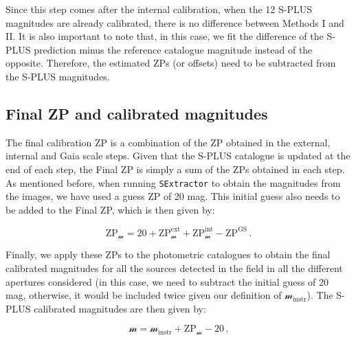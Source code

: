 \documentclass[fleqn,usenatbib]{mnras}
\begin{document}
Since this step comes after the internal calibration, when the 12 S-PLUS magnitudes are already calibrated, there is no difference between Methods I and II. It is also important to note that, in this case, we fit the difference of the S-PLUS prediction minus the reference catalogue magnitude instead of the opposite. Therefore, the estimated ZPs (or offsets) need to be subtracted from the S-PLUS magnitudes.

\subsection{Final ZP and calibrated magnitudes}

The final calibration ZP is a combination of the ZP obtained in the external, internal and Gaia scale steps. Given that the S-PLUS catalogue is updated at the end of each step, the Final ZP is simply a sum of the ZPs obtained in each step. As mentioned before, when running \texttt{SExtractor} to obtain the magnitudes from the images, we have used a guess ZP of 20 mag. This initial guess also needs to be added to the Final ZP, which is then given by:

\begin{equation}
    \mathrm{ZP}_\mathcal{m} = 20 + \mathrm{ZP}_\mathcal{m}^\mathrm{ext} + \mathrm{ZP}_\mathcal{m}^\mathrm{int} - \mathrm{ZP}^\mathrm{GS} \,.
\end{equation}

Finally, we apply these ZPs to the photometric catalogues to obtain the final calibrated magnitudes for all the sources detected in the field in all the different apertures considered (in this case, we need to subtract the initial guess of 20 mag, otherwise, it would be included twice given our definition of $\mathcal{m}_\mathrm{instr}$). The S-PLUS calibrated magnitudes are then given by:

\begin{equation}
    \mathcal{m} = \mathcal{m}_\mathrm{instr} + \mathrm{ZP}_\mathcal{m} - 20  \,.
\end{equation}
\end{document}
